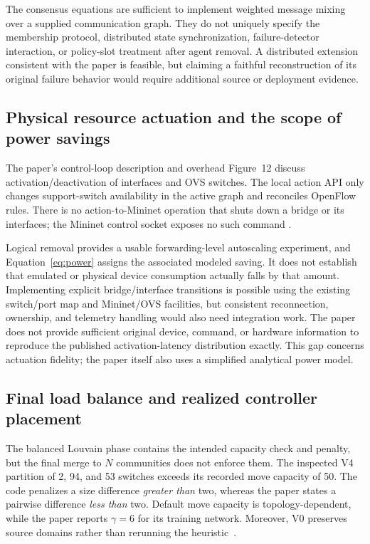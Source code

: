 \documentclass[11pt,a4paper]{article}
\begin{document}
The consensus equations are sufficient to implement weighted message mixing
over a supplied communication graph. They do not uniquely specify the
membership protocol, distributed state synchronization, failure-detector
interaction, or policy-slot treatment after agent removal. A distributed
extension consistent with the paper is feasible, but claiming a faithful
reconstruction of its original failure behavior would require additional
source or deployment evidence.

\subsection{Physical resource actuation and the scope of power savings}

The paper's control-loop description and overhead Figure~12 discuss
activation/deactivation of interfaces and OVS switches. The local action API
only changes support-switch availability in the active graph and reconciles
OpenFlow rules. There is no action-to-Mininet operation that shuts down a
bridge or its interfaces; the Mininet control socket exposes no such command
\cite{paper,code-routing,code-runtime}.

Logical removal provides a usable forwarding-level autoscaling experiment,
and Equation~\eqref{eq:power} assigns the associated modeled saving. It does
not establish that emulated or physical device consumption actually falls by
that amount. Implementing explicit bridge/interface transitions is possible
using the existing switch/port map and Mininet/OVS facilities, but consistent
reconnection, ownership, and telemetry handling would also need integration
work. The paper does not provide sufficient original device, command, or
hardware information to reproduce the published activation-latency distribution
exactly. This gap concerns actuation fidelity; the paper itself also uses a
simplified analytical power model.

\subsection{Final load balance and realized controller placement}

The balanced Louvain phase contains the intended capacity check and penalty,
but the final merge to $N$ communities does not enforce them. The inspected
V4 partition of 2, 94, and 53 switches exceeds its recorded move capacity of
50. The code penalizes a size difference \emph{greater than} two, whereas the
paper states a pairwise difference \emph{less than} two. Default move capacity
is topology-dependent, while the paper reports $\gamma=6$ for its training
network. Moreover, V0 preserves source domains rather than rerunning the
heuristic~\cite{paper,code-network,code-settings}.
\end{document}
